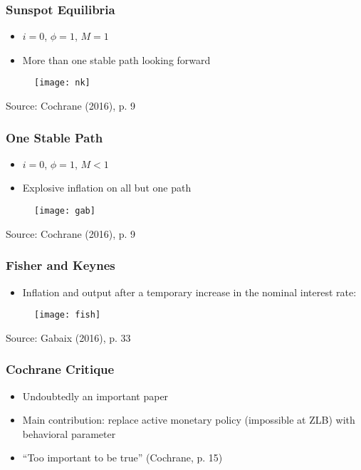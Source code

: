 \documentclass{beamer}
\begin{document}
\begin{frame}
	\frametitle{Sunspot Equilibria}
	\begin{itemize}
		\item $i = 0$, $\phi = 1$, $M = 1$
		\item More than one stable path looking forward
	\end{itemize}
	\begin{figure}[h]
		\texttt{[image: nk]}
	\end{figure}
	{\footnotesize Source: Cochrane (2016), p. 9}
\end{frame}

 
 \begin{frame}
 	\frametitle{One Stable Path}
 	\begin{itemize}
 		\item $i = 0$, $\phi = 1$, $M < 1$
 		\item Explosive inflation on all but one path
 	\end{itemize}
 	\begin{figure}[h]
 		\texttt{[image: gab]}
 	\end{figure}
 	{\footnotesize Source: Cochrane (2016), p. 9}
 \end{frame}
 
 
\begin{frame}
	\frametitle{Fisher and Keynes}
	\begin{itemize}
		\item Inflation and output after a temporary increase in the nominal interest rate:
	\end{itemize}
	\begin{figure}[h]
	\texttt{[image: fish]}
	\end{figure}
	{\footnotesize Source: Gabaix (2016), p. 33}
\end{frame}


\begin{frame}
	\frametitle{Cochrane Critique}
	\begin{itemize}
		\item Undoubtedly an important paper
		\item Main contribution: replace active monetary policy (impossible at ZLB) with behavioral parameter
		\item ``Too important to be true'' (Cochrane, p. 15)
	\end{itemize}
\end{frame}
\end{document}
